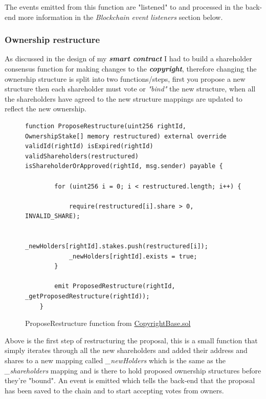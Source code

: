 \documentclass[12pt]{article}
\newcommand{\keyword}[1]{\textbf{\textit{#1}}}
\begin{document}
The events emitted from this function are "listened" to and processed in the back-end more information in the \textit{Blockchain event listeners} section below.

\subsubsection{Ownership restructure}

As discussed in the design of my \keyword{smart contract} I had to build a shareholder consensus function for making changes to the \keyword{copyright}, therefore changing the ownership structure is split into two functions/steps, first you propose a new structure then each shareholder must vote or \textit{"bind"} the new structure, when all the shareholders have agreed to the new structure mappings are updated to reflect the new ownership.

\begin{figure}[H]
\caption{ProposeRestructure function from \href{https://github.com/MrHarrisonBarker/CRPL/blob/main/CRPL.Contracts/contracts/Copyrights/CopyrightBase.sol}{CopyrightBase.sol}}
\centering
\begin{lstlisting}[language=Solidity]
function ProposeRestructure(uint256 rightId, OwnershipStake[] memory restructured) external override validId(rightId) isExpired(rightId) validShareholders(restructured) isShareholderOrApproved(rightId, msg.sender) payable {
        
        for (uint256 i = 0; i < restructured.length; i++) {

            require(restructured[i].share > 0, INVALID_SHARE);

            _newHolders[rightId].stakes.push(restructured[i]);
            _newHolders[rightId].exists = true;
        }   

        emit ProposedRestructure(rightId, _getProposedRestructure(rightId));
    }	
\end{lstlisting}
\end{figure}

Above is the first step of restructuring the proposal, this is a small function that simply iterates through all the new shareholders and added their address and shares to a new mapping called \textit{\_newHolders} which is the same as the \textit{\_shareholders} mapping and is there to hold proposed ownership structures before they're "bound". An event is emitted which tells the back-end that the proposal has been saved to the chain and to start accepting votes from owners.
\end{document}
